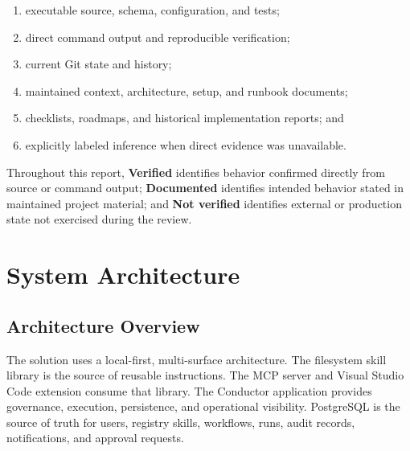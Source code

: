 \documentclass[12pt]{report}
\newcommand{\verified}{\textbf{Verified}}
\newcommand{\documented}{\textbf{Documented}}
\newcommand{\notverified}{\textbf{Not verified}}
\begin{document}
\begin{enumerate}
  \item executable source, schema, configuration, and tests;
  \item direct command output and reproducible verification;
  \item current Git state and history;
  \item maintained context, architecture, setup, and runbook documents;
  \item checklists, roadmaps, and historical implementation reports; and
  \item explicitly labeled inference when direct evidence was unavailable.
\end{enumerate}

Throughout this report, \verified{} identifies behavior confirmed directly from source or command output; \documented{} identifies intended behavior stated in maintained project material; and \notverified{} identifies external or production state not exercised during the review.

\chapter{System Architecture}

\section{Architecture Overview}

The solution uses a local-first, multi-surface architecture. The filesystem skill library is the source of reusable instructions. The MCP server and Visual Studio Code extension consume that library. The Conductor application provides governance, execution, persistence, and operational visibility. PostgreSQL is the source of truth for users, registry skills, workflows, runs, audit records, notifications, and approval requests.
\end{document}
